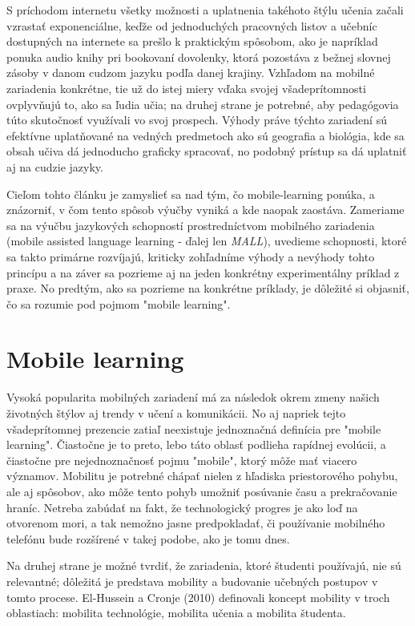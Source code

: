 \documentclass[10pt,twoside,slovak,a4paper]{article}
\begin{document}
S príchodom internetu všetky možnosti a uplatnenia takéhoto štýlu učenia začali vzrastať exponenciálne, keďže od jednoduchých pracovných listov a učebníc dostupných na internete sa prešlo k praktickým spôsobom, ako je napríklad ponuka audio knihy pri bookovaní dovolenky, ktorá pozostáva z bežnej slovnej zásoby v danom cudzom jazyku podľa danej krajiny. Vzhľadom na mobilné zariadenia konkrétne, tie už do istej miery vďaka svojej všadeprítomnosti ovplyvňujú to, ako sa ľudia učia; na druhej strane je potrebné, aby pedagógovia túto skutočnosť využívali vo svoj prospech\cite{KukulskaHulme2009}. Výhody práve týchto zariadení sú efektívne uplatňované na vedných predmetoch ako sú geografia a biológia, kde sa obsah učiva dá jednoducho graficky spracovať, no podobný prístup sa dá uplatniť aj na cudzie jazyky.

Cieľom tohto článku je zamyslieť sa nad tým, čo mobile-learning ponúka, a znázorniť, v čom tento spôsob výučby vyniká a kde naopak zaostáva. Zameriame sa na výučbu jazykových schopností prostredníctvom mobilného zariadenia (mobile assisted language learning - ďalej len \emph{MALL}), uvedieme schopnosti, ktoré sa takto primárne rozvíjajú, kriticky zohľadníme výhody a nevýhody tohto princípu a na záver sa pozrieme aj na jeden konkrétny experimentálny príklad z praxe. No predtým, ako sa pozrieme na konkrétne príklady, je dôležité si objasniť, čo sa rozumie pod pojmom "mobile learning".


\section{Mobile learning} \label{ml}

Vysoká popularita mobilných zariadení má za následok okrem zmeny našich životných štýlov aj trendy v učení a komunikácii. No aj napriek tejto všadeprítomnej prezencie zatiaľ neexistuje jednoznačná definícia pre "mobile learning"\cite{Kim2012}. Čiastočne je to preto, lebo táto oblasť podlieha rapídnej evolúcii, a čiastočne pre nejednoznačnosť pojmu "mobile", ktorý môže mať viacero významov. Mobilitu je potrebné chápať nielen z hľadiska priestorového pohybu, ale aj spôsobov, ako môže tento pohyb umožniť posúvanie času a prekračovanie hraníc\cite{KukulskaHulme2009}. Netreba zabúdať na fakt, že technologický progres je ako loď na otvorenom mori, a tak nemožno jasne predpokladať, či používanie mobilného telefónu bude rozšírené v takej podobe, ako je tomu dnes. 

Na druhej strane je možné tvrdiť, že zariadenia, ktoré študenti používajú, nie sú relevantné; dôležitá je predstava mobility a budovanie učebných postupov v tomto procese\cite{KukulskaHulme2009}. El-Hussein a Cronje (2010) definovali koncept mobility v troch oblastiach: mobilita technológie, mobilita učenia a mobilita študenta\cite{Kim2012}. 
\end{document}
